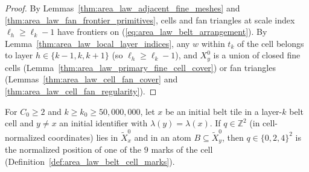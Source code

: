 \begin{proof}
    \leanok
    By Lemmas~\ref{thm:area_law_adjacent_fine_meshes} and \ref{thm:area_law_fan_frontier_primitives},
    cells and fan triangles at scale index $\ell_h\ge\ell_k-1$ have frontiers on
    (\ref{eq:area_law_belt_arrangement}). By Lemma~\ref{thm:area_law_local_layer_indices}, any $w$
    within $t_k$ of the cell belongs to layer $h\in\{k-1,k,k+1\}$ (so $\ell_h\ge\ell_k-1$), and
    $X_y^0$ is a union of closed fine cells (Lemma~\ref{thm:area_law_primary_fine_cell_cover}) or
    fan triangles (Lemmas~\ref{thm:area_law_cell_fan_cover} and \ref{thm:area_law_cell_fan_regularity}).
\end{proof}

\begin{lemma}
    \label{thm:area_law_initial_belt_contacts}
    \leanok
    For $C_0\ge2$ and $k\ge k_0\ge50{,}000{,}000$, let $x$ be an initial belt tile in a layer-$k$
    belt cell and $y\ne x$ an initial identifier with $\lambda(y)=\lambda(x)$. If $q\in\mathbb Z^2$
    (in cell-normalized coordinates) lies in $\tilde X_x^0$ and in an atom $B\subseteq\tilde X_y^0$,
    then $q\in\{0,2,4\}^2$ is the normalized position of one of the $9$ marks of the cell
    (Definition~\ref{def:area_law_belt_cell_marks}).
\end{lemma}

